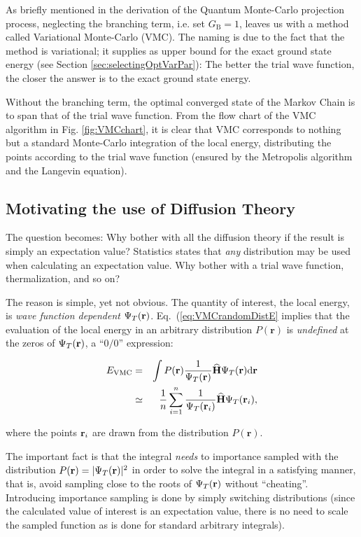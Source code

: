 As briefly mentioned in the derivation of the Quantum Monte-Carlo projection process, neglecting the branching term, i.e. set $G_\mathrm{B}=1$, leaves us with a method called Variational Monte-Carlo (VMC). The naming is due to the fact that the method is variational; it supplies as upper bound for the exact ground state energy (see Section \ref{sec:selectingOptVarPar}): The better the trial wave function, the closer the answer is to the exact ground state energy.

Without the branching term, the optimal converged state of the Markov Chain is to span that of the trial wave function. From the flow chart of the VMC algorithm in Fig. \ref{fig:VMCchart}, it is clear that VMC corresponds to nothing but a standard Monte-Carlo integration of the local energy, distributing the points according to the trial wave function (ensured by the Metropolis algorithm and the Langevin equation).

\subsection{Motivating the use of Diffusion Theory}

The question becomes: Why bother with all the diffusion theory if the result is simply an expectation value? Statistics states that \textit{any} distribution may be used when calculating an expectation value. Why bother with a trial wave function, thermalization, and so on? 

The reason is simple, yet not obvious. The quantity of interest, the local energy, is \textit{wave function dependent} $\Psi_T(\mathbf{r})$. Eq.~(\ref{eq:VMCrandomDistE} implies that the evaluation of the local energy in an arbitrary distribution $P(\mathbf{r})$ is \textit{undefined} at the zeros of $\Psi_T(\mathbf{r})$, a ``$0/0$'' expression:

\begin{eqnarray}
 E_\mathrm{VMC} &=& \int P(\mathbf{r}) \frac{1}{\Psi_T(\mathbf{r})}{\bf\widehat{H}}\Psi_T(\mathbf{r})\mathrm{d}\mathbf{r} \nonumber\\
                   &\simeq& \frac{1}{n}\sum_{i=1}^n \frac{1}{\Psi_T(\mathbf{r}_i)}{\bf\widehat{H}}\Psi_T(\mathbf{r}_i), \label{eq:VMCrandomDistE}
\end{eqnarray}

where the points $\mathbf{r}_i$ are drawn from the distribution $P(\mathbf{r})$.

The important fact is that the integral \textit{needs} to importance sampled with the distribution $P(\mathbf{r})=|\Psi_T(\mathbf{r})|^2$  in order to solve the integral in a satisfying manner, that is, avoid sampling close to the roots of $\Psi_T(\mathbf{r})$ without ``cheating''. Introducing importance sampling is done by simply switching distributions (since the calculated value of interest is an expectation value, there is no need to scale the sampled function as is done for standard arbitrary integrals).

